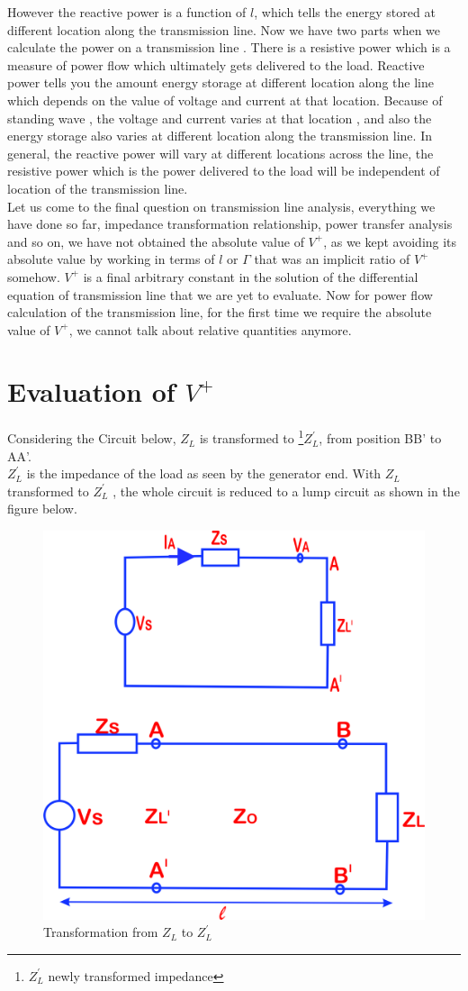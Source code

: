 However the reactive power is a function of $l$, which tells the energy stored at different location along the transmission line. Now we have two parts when we calculate the power on a transmission line . There is a resistive power which is a measure of power flow which ultimately gets delivered to the load. Reactive power tells you the amount energy storage at different location along the line which depends on the value of voltage and current at that location. Because of standing wave , the voltage and current varies at that location , and also the energy storage also varies at different location along the transmission line. In general, the reactive power will vary at different locations across the line, the resistive power which is the power delivered to the load will be independent of location of the transmission line.\\
Let us come to the final question on transmission line analysis, everything we have done so far, impedance transformation relationship, power transfer analysis and so on, we have not obtained the absolute value of $V^+$, as we kept avoiding its absolute value by working in terms of $l$ or $\Gamma$ that was an implicit ratio of $V^+$ somehow. $V^+$ is a final arbitrary constant in the solution of the differential equation of transmission line that we are yet to evaluate. Now for power flow calculation of the transmission line, for the first time we require the absolute value of $V^+$, we cannot talk about relative quantities anymore.

\section{Evaluation of \textbf{$ V ^ {+} $} } 
Considering the Circuit below, $Z_L$ is transformed to \footnote{$Z^{'}_L$ newly transformed impedance}$Z^{'}_L$, from position BB' to AA'.\\
$Z^{'}_L$ is the impedance of the load as seen by the generator end. With $Z_L$ transformed to $Z^{'}_L$ , the whole circuit is reduced to a lump circuit as shown in the figure below.
\begin{figure}[h]
\centering
\includegraphics[width=0.5\linewidth]{./graphics/qwerrtt}
\caption{Transformation from $Z_L$ to $Z_{L}^'$}
\label{fig:qwerrtt}
\end{figure}

